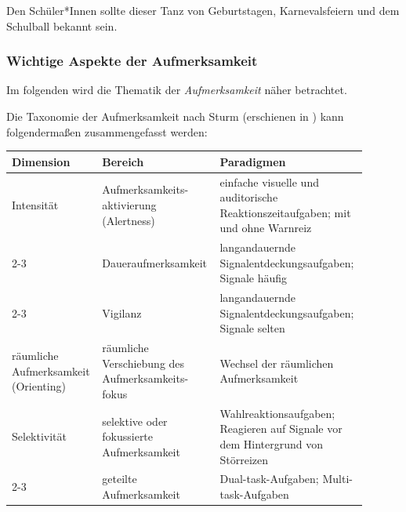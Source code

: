 \documentclass[a4paper, 12pt]{article}
\begin{document}

Den Schüler*Innen sollte dieser Tanz von Geburtstagen, Karnevalsfeiern und dem Schulball bekannt sein.\\


\subsubsection*{Wichtige Aspekte der Aufmerksamkeit}

Im folgenden wird die Thematik der \emph{Aufmerksamkeit} näher betrachtet.

Die Taxonomie der Aufmerksamkeit nach Sturm (erschienen in \cite{Lehrner.2011}) kann folgendermaßen zusammengefasst werden:

\begin{tabular}{|p{0.2\linewidth}|p{0.3\linewidth}|p{0.4\linewidth}|}
	\hline 
	Dimension & Bereich & Paradigmen \\ 
	\hline 
	Intensität & Aufmerksamkeits-aktivierung (Alertness) & einfache visuelle und auditorische Reaktionszeitaufgaben; mit und ohne Warnreiz \\ 
	\cline{2-3} %
	 & Daueraufmerksamkeit & langandauernde Signalentdeckungsaufgaben; Signale häufig \\ 
	\cline{2-3}
	 & Vigilanz & langandauernde Signalentdeckungsaufgaben; Signale selten\\
	 \hline
	 räumliche Aufmerksamkeit (Orienting) & räumliche Verschiebung des Aufmerksamkeits-fokus & Wechsel der räumlichen Aufmerksamkeit \\
	 \hline
	 Selektivität & selektive oder fokussierte Aufmerksamkeit & Wahlreaktionsaufgaben; Reagieren auf Signale vor dem Hintergrund von Störreizen\\
	 \cline{2-3}
	  & geteilte Aufmerksamkeit & Dual-task-Aufgaben; Multi-task-Aufgaben\\
	  \hline
\end{tabular} 

\end{document}
